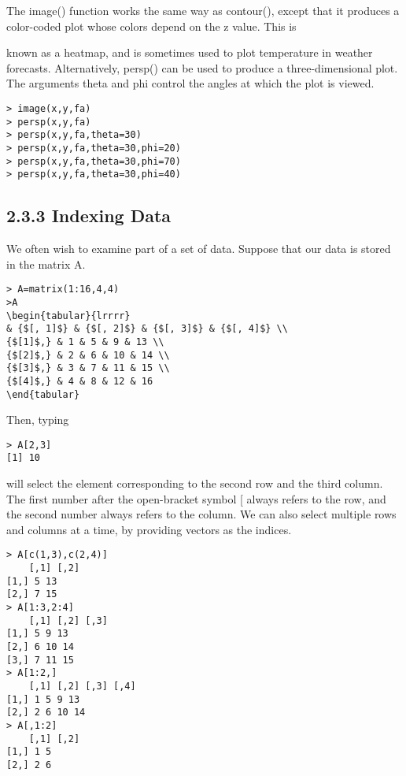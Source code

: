\documentclass[10pt]{article}
\begin{document}
The image() function works the same way as contour(), except that it produces a color-coded plot whose colors depend on the z value. This is


known as a heatmap, and is sometimes used to plot temperature in weather forecasts. Alternatively, persp() can be used to produce a three-dimensional plot. The arguments theta and phi control the angles at which the plot is viewed.

\begin{verbatim}
> image(x,y,fa)
> persp(x,y,fa)
> persp(x,y,fa,theta=30)
> persp(x,y,fa,theta=30,phi=20)
> persp(x,y,fa,theta=30,phi=70)
> persp(x,y,fa,theta=30,phi=40)
\end{verbatim}

\subsection*{2.3.3 Indexing Data}
We often wish to examine part of a set of data. Suppose that our data is stored in the matrix A.

\begin{verbatim}
> A=matrix(1:16,4,4)
>A
\begin{tabular}{lrrrr} 
& {$[, 1]$} & {$[, 2]$} & {$[, 3]$} & {$[, 4]$} \\
{$[1]$,} & 1 & 5 & 9 & 13 \\
{$[2]$,} & 2 & 6 & 10 & 14 \\
{$[3]$,} & 3 & 7 & 11 & 15 \\
{$[4]$,} & 4 & 8 & 12 & 16
\end{tabular}
\end{verbatim}

Then, typing

\begin{verbatim}
> A[2,3]
[1] 10
\end{verbatim}

will select the element corresponding to the second row and the third column. The first number after the open-bracket symbol [ always refers to the row, and the second number always refers to the column. We can also select multiple rows and columns at a time, by providing vectors as the indices.

\begin{verbatim}
> A[c(1,3),c(2,4)]
    [,1] [,2]
[1,] 5 13
[2,] 7 15
> A[1:3,2:4]
    [,1] [,2] [,3]
[1,] 5 9 13
[2,] 6 10 14
[3,] 7 11 15
> A[1:2,]
    [,1] [,2] [,3] [,4]
[1,] 1 5 9 13
[2,] 2 6 10 14
> A[,1:2]
    [,1] [,2]
[1,] 1 5
[2,] 2 6
\end{verbatim}
\end{document}
